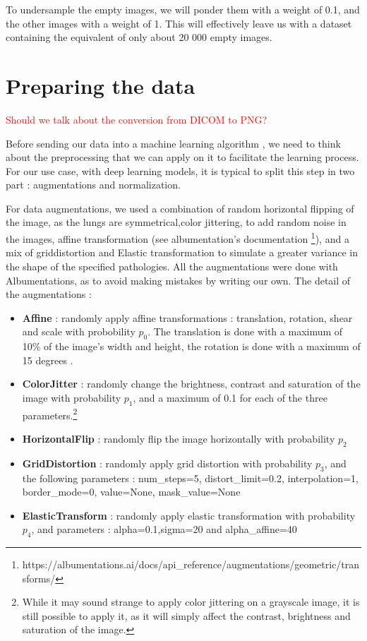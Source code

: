 \documentclass[11pt]{article}
\newcommand\myworries[1]{\textcolor{red}{#1}}
\begin{document}
    To undersample the empty images, we will ponder them with a weight of 0.1, and the other images with a weight of 1. This will effectively leave us with a dataset containing the equivalent of only about 20 000 empty images.


    \section{Preparing the data}

    \myworries{Should we talk about the conversion from DICOM to PNG?}

    Before sending our data into a machine learning algorithm , we need to think about the preprocessing that we can
    apply on it to facilitate the learning process. For our use case, with deep learning models, it is typical to
    split this step in two part : augmentations and normalization.


    For data augmentations, we used a combination of random horizontal flipping of the image, as the lungs are symmetrical,color jittering, to add random noise
    in the images, affine transformation (see albumentation's documentation \footnote{https://albumentations.ai/docs/api_reference/augmentations/geometric/transforms/}), and a mix of griddistortion and Elastic transformation to simulate a greater
    variance in the shape of the specified pathologies. All the augmentations were done with Albumentations, as to avoid making mistakes
    by writing our own\cite{albumentations}. The detail of the augmentations :

    \begin{itemize}
        \item \textbf{Affine} : randomly apply affine transformations : translation, rotation, shear and scale with
        probobility $p_0$. The translation is done with a maximum of 10\% of the image's width and height, the
        rotation is done with a maximum of 15 degrees .
        \item \textbf{ColorJitter} : randomly change the brightness, contrast and saturation of the image with
        probability $p_1$, and a maximum of 0.1 for each of the three parameters.\footnote{While it may sound strange
        to apply color jittering on a grayscale image, it is still possible to apply it, as it will simply affect the
        contrast, brightness and saturation of the image.}
        \item \textbf{HorizontalFlip} : randomly flip the image horizontally with probability $p_2$
        \item \textbf{GridDistortion} : randomly apply grid distortion with probability $p_3$, and the following
        parameters : num\_steps=5, distort\_limit=0.2, interpolation=1, border\_mode=0, value=None, mask\_value=None
        \item \textbf{ElasticTransform} : randomly apply elastic transformation with probability $p_4$, and
        parameters : alpha=0.1,sigma=20 and alpha\_affine=40
        \label{tab:augmentations}
    \end{itemize}
\end{document}
